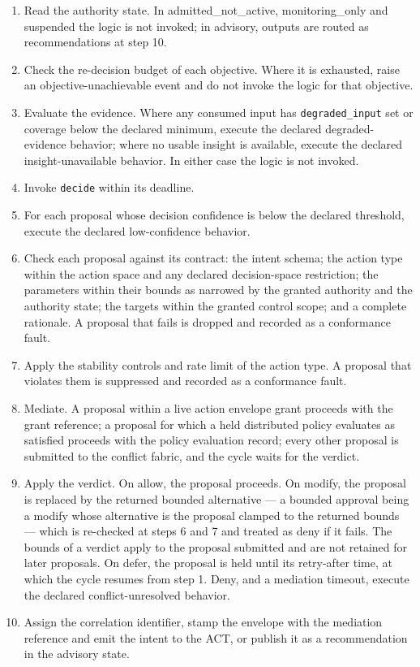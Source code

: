 \begin{enumerate}
\def\labelenumi{\arabic{enumi}.}
\tightlist
\item
  Read the authority state. In
  admitted\_\allowbreak{}not\_\allowbreak{}active,
  monitoring\_\allowbreak{}only and suspended the logic is not invoked;
  in advisory, outputs are routed as recommendations at step 10.
\item
  Check the re-decision budget of each objective. Where it is exhausted,
  raise an objective-unachievable event and do not invoke the logic for
  that objective.
\item
  Evaluate the evidence. Where any consumed input has
  \texttt{degraded\_\allowbreak{}input} set or coverage below the declared minimum,
  execute the declared degraded-evidence behavior; where no usable
  insight is available, execute the declared insight-unavailable
  behavior. In either case the logic is not invoked.
\item
  Invoke \texttt{decide} within its deadline.
\item
  For each proposal whose decision confidence is below the declared
  threshold, execute the declared low-confidence behavior.
\item
  Check each proposal against its contract: the intent schema; the
  action type within the action space and any declared decision-space
  restriction; the parameters within their bounds as narrowed by the
  granted authority and the authority state; the targets within the
  granted control scope; and a complete rationale. A proposal that fails
  is dropped and recorded as a conformance fault.
\item
  Apply the stability controls and rate limit of the action type. A
  proposal that violates them is suppressed and recorded as a
  conformance fault.
\item
  Mediate. A proposal within a live action envelope grant proceeds with
  the grant reference; a proposal for which a held distributed policy
  evaluates as satisfied proceeds with the policy evaluation record;
  every other proposal is submitted to the conflict fabric, and the
  cycle waits for the verdict.
\item
  Apply the verdict. On allow, the proposal proceeds. On modify, the
  proposal is replaced by the returned bounded alternative --- a bounded
  approval being a modify whose alternative is the proposal clamped to
  the returned bounds --- which is re-checked at steps 6 and 7 and
  treated as deny if it fails. The bounds of a verdict apply to the
  proposal submitted and are not retained for later proposals. On defer,
  the proposal is held until its retry-after time, at which the cycle
  resumes from step 1. Deny, and a mediation timeout, execute the
  declared conflict-unresolved behavior.
\item
  Assign the correlation identifier, stamp the envelope with the
  mediation reference and emit the intent to the ACT, or publish it as a
  recommendation in the advisory state.
\end{enumerate}

